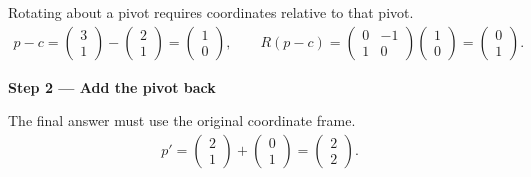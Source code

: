 \documentclass[letterpaper,11pt,english,openany,oneside]{jupyterBook}
\begin{document}
\sphinxAtStartPar
{} Rotating about a pivot requires coordinates relative to that pivot.
{\color{QuizMathBlue} \begin{equation*}
\begin{split}
p-c=\begin{pmatrix}3\\1\end{pmatrix}-\begin{pmatrix}2\\1\end{pmatrix}=\begin{pmatrix}1\\0\end{pmatrix},\qquad R(p-c)=\begin{pmatrix}0&-1\\1&0\end{pmatrix}\begin{pmatrix}1\\0\end{pmatrix}=\begin{pmatrix}0\\1\end{pmatrix}.
\end{split}
\end{equation*}}
\par

\par\medskip{}
{\color{QuizStepRed}\bfseries Step 2 — Add the pivot back}\par\smallskip

\sphinxAtStartPar
{} The final answer must use the original coordinate frame.
{\color{QuizMathBlue} \begin{equation*}
\begin{split}
p'=\begin{pmatrix}2\\1\end{pmatrix}+\begin{pmatrix}0\\1\end{pmatrix}=\begin{pmatrix}2\\2\end{pmatrix}.
\end{split}
\end{equation*}}
\par

\par\medskip
\end{document}

